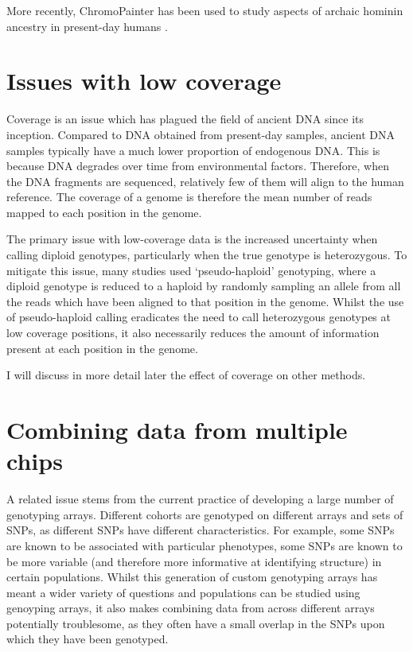 More recently, ChromoPainter has been used to study aspects of archaic hominin ancestry in present-day humans \cite{JACOBS20191010, teixeira2021widespread}.

\section{Issues with low coverage}

Coverage is an issue which has plagued the field of ancient DNA since its inception. Compared to DNA obtained from present-day samples, ancient DNA samples typically have a much lower proportion of endogenous DNA. This is because DNA degrades over time from environmental factors. Therefore, when the DNA fragments are sequenced, relatively few of them will align to the human reference. The coverage of a genome is therefore the mean number of reads mapped to each position in the genome. 

The primary issue with low-coverage data is the increased uncertainty when calling diploid genotypes, particularly when the true genotype is heterozygous. To mitigate this issue, many studies used `pseudo-haploid' genotyping, where a diploid genotype is reduced to a haploid by randomly sampling an allele from all the reads which have been aligned to that position in the genome. Whilst the use of pseudo-haploid calling eradicates the need to call heterozygous genotypes at low coverage positions, it also necessarily reduces the amount of information present at each position in the genome.

I will discuss in more detail later the effect of coverage on other methods. 

\section{Combining data from multiple chips}

A related issue stems from the current practice of developing a large number of genotyping arrays. Different cohorts are genotyped on different arrays and sets of SNPs, as different SNPs have different characteristics. For example, some SNPs are known to be associated with particular phenotypes, some SNPs are known to be more variable (and therefore more informative at identifying structure) in certain populations. Whilst this generation of custom genotyping arrays has meant a wider variety of questions and populations can be studied using genoyping arrays, it also makes combining data from across different arrays potentially troublesome, as they often have a small overlap in the SNPs upon which they have been genotyped.

